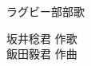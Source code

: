 \documentclass[10pt,b5j]{tarticle} %
\begin{document}
\begin{minipage}[c]{0.7\hsize} %
    \begin{center}
        {\LARGE
            ラグビー部部歌 %
        }
        {\small 
        }
    \end{center}
\end{minipage}
\begin{minipage}[c]{0.3\hsize} %
    \begin{flushright} %
        坂井稔君 作歌\\飯田毅君 作曲 %
    \end{flushright}
\end{minipage}
\end{document}
